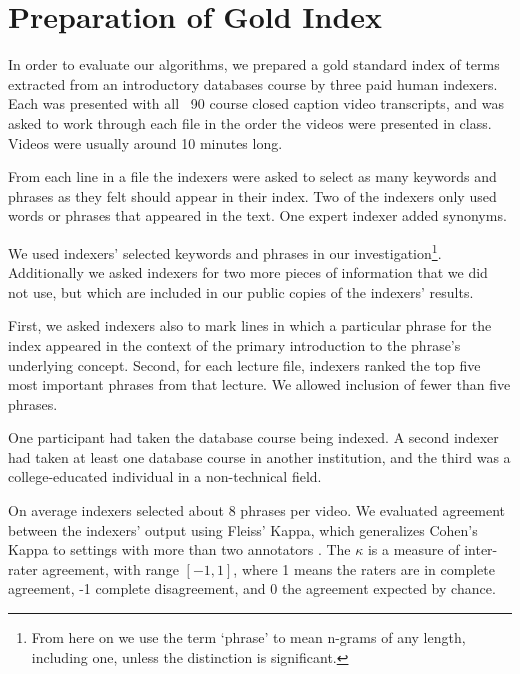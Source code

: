 \section{Preparation of Gold Index}
\label{sec:gold}


In order to evaluate our algorithms, we prepared a gold standard index
of terms extracted from an introductory databases course by three paid
human indexers. Each was presented with all ~90 course closed caption
video transcripts, and was asked to work through each file in the
order the videos were presented in class. Videos were usually around
10 minutes long.

From each line in a file the indexers were asked to select as many
keywords and phrases as they felt should appear in their
index. Two of the indexers only used words or phrases that
appeared in the text. One expert indexer added synonyms.

We used indexers' selected keywords and phrases in our
investigation\footnote{From here on we use the term `phrase' to mean
  n-grams of any length, including one, unless the distinction is
  significant.}. Additionally we asked indexers for two more pieces of
information that we did not use, but which are included in our public
copies of the indexers' results.

First, we asked indexers also to mark lines in which a particular
phrase for the index appeared in the context of the primary
introduction to the phrase's underlying concept.  Second, for each
lecture file, indexers ranked the top five most important phrases from
that lecture. We allowed inclusion of fewer than five phrases.

One participant had taken the database course being indexed. A second
indexer had taken at least one database course in another institution,
and the third was a college-educated individual in a non-technical
field.

On average indexers selected about 8 phrases per video.  We evaluated
agreement between the indexers' output using Fleiss' Kappa, which
generalizes Cohen's Kappa to settings with more than two annotators
\cite{fleiss1971measuring}. The $\kappa$ is a measure of inter-rater
agreement, with range $[-1, 1]$, where 1 means the raters are in
complete agreement, -1 complete disagreement, and 0 the agreement
expected by chance.

